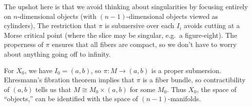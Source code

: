 The upshot here is that we avoid thinking about singularities by focusing entirely on $n$-dimensional objects (with $(n-1)$-dimensional objects viewed as cylinders),
The restriction that $\pi$ is submersive over each $I_i$ avoids cutting at a Morse critical point (where the slice may be singular, e.g.\ a figure-eight).
The properness of $\pi$ ensures that all fibers are compact, so we don't have to worry about anything going off to infinity.

\begin{ex}
	For $X_0$, we have $I_0 = (a, b)$, so $\pi: M \to (a, b)$ is a proper submersion.
	Ehresmann's fibration theorem implies that $\pi$ is a fiber bundle, so contractibility of $(a, b)$ tells us that $M \cong M_0 \times (a, b)$ for some $M_0$.
	Thus $X_0$, the space of ``objects,'' can be identified with the space of $(n-1)$-manifolds.
\end{ex}

